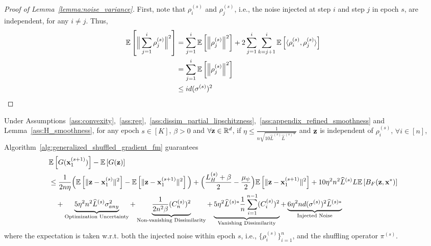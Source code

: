 \begin{proof}[Proof of Lemma~\ref{lemma:noise_variance}]
    First, note that $\rho_i^{(s)}$ and $\rho_j^{(s)}$, i.e., the noise injected at step $i$ and step $j$ in epoch $s$, are independent, for any $i \neq j$. Thus,
    \begin{align}
        \mathbb{E}\left[ \Big\|\sum_{j=1}^{i} \rho_j^{(s)} \Big\|^2 \right]
        &= \sum_{j=1}^{i}\mathbb{E}\left[\Big\| \rho_j^{(s)}\Big\|^2\right]
        + 2 \sum_{j=1}^{i} \sum_{k=j+1}^{i}
        \mathbb{E}\left[\langle \rho_i^{(s)}, \rho_j^{(s)}\rangle \right]\\
        &= \sum_{j=1}^{i}\mathbb{E}\left[\Big\| \rho_j^{(s)}\Big\|^2\right]\\
        &\leq i d (\sigma^{(s)})^2
    \end{align}
\end{proof}




\begin{lemma}
\label{lemma:expected_one_epoch_convergence}
    Under Assumptions~\ref{ass:convexity},~\ref{ass:reg},~\ref{ass:dissim_partial_lipschitzness},~\ref{ass:appendix_refined_smoothness} and Lemma~\ref{ass:H_smoothness}, for any epoch $s\in [K]$, $\beta > 0$ and $\forall {\mathbf{z}} \in \mathbb{R}^d$, 
    if $\eta \leq \frac{1}{n\sqrt{10 \widehat{L}^{(s)} \widehat{L}^{(s)*}}}$ and ${\mathbf{z}}$ is independent of $\rho_i^{(s)}$, $\forall i\in [n]$,
    Algorithm~\ref{alg:generalized_shuffled_gradient_fm} guarantees
    \begin{align}
        &\mathbb{E}\left[G({\mathbf{x}}_1^{(s+1)})\right] - \mathbb{E}\left[G({\mathbf{z}})\right]\\
        \nonumber
        &\leq  \frac{1}{2 n \eta}\Big( \mathbb{E}\left[\|{\mathbf{z}} - {\mathbf{x}}_1^{(s)}\|^2\right]  - \mathbb{E}\left[ \|{\mathbf{z}} - {\mathbf{x}}_1^{(s+1)}\|^2 \right] \Big)
        + \Big( \frac{L_H^{(s)} + \beta}{2} - \frac{\mu_{\psi}}{2} \Big) \mathbb{E}\left[\| {\mathbf{z}} - {\mathbf{x}}_1^{(s+1)}\|^2 \right]
        + 10\eta^2 n^2 \widehat{L}^{(s)} L \mathbb{E}\left[  B_F({\mathbf{z}}, {\mathbf{x}}^*)\right]\\
        \nonumber
        &\quad + \underbrace{
            5 \eta^2 n^2 \widehat{L}^{(s)}\sigma_{any}^2
        }_{\text{Optimization Uncertainty}}
        + \underbrace{
            \frac{1}{2n^2 \beta}(C_n^{(s)})^2 
        }_{\text{Non-vanishing Dissimilarity}}
         + \underbrace{
            5\eta^2 \widehat{L}^{(s)*} \frac{1}{n} \sum_{i=1}^{n-1}(C_i^{(s)})^2
        }_{\text{Vanishing Dissimilarity}}
         + \underbrace{
            6 \eta^2 nd (\sigma^{(s)})^2 \widehat{L}^{(s)*}
        }_{\text{Injected Noise}}
    \end{align}
    where the expectation is taken w.r.t. both the injected noise within epoch $s$, i.e., $\{\rho_i^{(s)}\}_{i=1}^{n}$, and the shuffling operator $\pi^{(s)}$.
\end{lemma}


